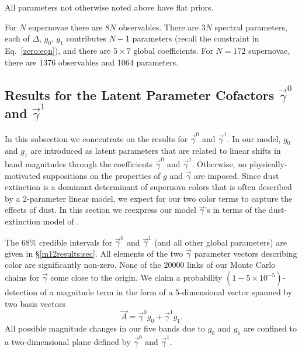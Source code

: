 \documentclass[trackchanges]{aastex62}   	%
\begin{document}
All parameters not  otherwise noted above have flat priors.

For $N$ supernovae there are $8N$ observables.  There are $3N$ spectral parameters, each of
$\Delta$, $g_0$, $g_1$ contributes $N-1$ parameters
(recall the constraint in Eq.~\ref{zero:eqn}),  and there are $5 \times 7$ global coefficients.
For $N=172$ supernovae, there are 1376 observables and 1064  parameters.


\subsection{Results for the Latent Parameter Cofactors  $\vec{\gamma}^0$ and $\vec{\gamma}^1$  }
\label{results1:sec}
In this subsection we concentrate on the results for $\vec{\gamma}^0$ and $\vec{\gamma}^1$.
In our model, $g_0$ and $g_1$ are introduced as latent parameters that are related to linear shifts in band magnitudes through
the  coefficients $\vec{\gamma}^0$ and
$\vec{\gamma}^1$.  Otherwise, no physically-motivated suppositions on the properties of $g$ and $\vec{\gamma}$ are imposed.
Since dust extinction is a dominant determinant of supernova colors that is often described by a 2-parameter linear model, we expect
for our two  color terms to capture the effects of dust.
In this section we reexpress our model $\vec{\gamma}$'s in terms of
the dust-extinction model of \citet{1999PASP..111...63F} .

The 68\% credible intervals for $\vec{\gamma}^0$ and $\vec{\gamma}^1$ (and all other global parameters) are given in \S\ref{m12results:sec}.
All elements of the two $\vec{\gamma}$ parameter vectors 
describing color
are significantly non-zero.
None of the 20000 links of 
our Monte Carlo chains for $\vec{\gamma}$ come close to the origin.   We claim 
a probability $(1-5\times 10^{-5})$-detection of
a magnitude term in the form of a 5-dimensional vector spanned by two basis vectors
\begin{equation}
\vec{A} = \vec{\gamma}^0 g_0 +  \vec{\gamma}^1 g_1.
\end{equation}
All possible magnitude changes in our five bands due to $g_0$ and $g_1$ are confined to a two-dimensional
plane defined by $\vec{\gamma}^0$ and  $\vec{\gamma}^1$. 
\end{document}
